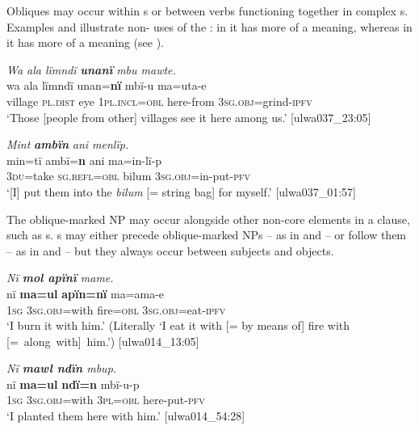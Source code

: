 Obliques may occur within  s or between verbs functioning together in complex s. Examples  and  illustrate non- uses of the : in  it has more of a  meaning, whereas in  it has more of a  meaning (see ).

\ea%
    \label{ex:clause:67}
          \textit{Wa ala lïmndï} \textbf{\textit{unanï}} \textit{mbu mawte.}\\
\gll    wa    ala      lïmndï  unan=\textbf{nï}    mbï-u     ma=uta-e\\
    village  \textsc{pl.dist}  eye    \textsc{1pl.incl=obl}  here-from    3\textsc{sg.obj}=grind-\textsc{ipfv}\\
\glt `Those [people from other] villages see it here among us.’ [ulwa037\_23:05]
\z

\ea%
    \label{ex:clause:68}
          \textit{Mint} \textbf{\textit{ambïn}} \textit{ani menlïp.}\\
\gll    min=tï    ambï=\textbf{n}    ani    ma=in-lï-p\\
    3\textsc{du}=take  \textsc{sg.refl=obl}  bilum  \textsc{3sg.obj}=in-put-\textsc{pfv}\\
\glt `[I] put them into the \textit{bilum} [= string bag] for myself.’ [ulwa037\_01:57]
\z

The oblique-marked NP may occur alongside other non-core elements in a clause, such as s. s may either precede oblique-marked NPs -- as in  and  -- or follow them -- as in  and  -- but they always occur between subjects and objects.

\ea%
    \label{ex:clause:69}
          \textit{Nï \textbf{mol apïnï} mame.}\\
\gll    nï    \textbf{ma=ul}      \textbf{apïn=nï}   ma=ama-e\\
    1\textsc{sg}  3\textsc{sg.obj}=with  fire=\textsc{obl}  3\textsc{sg.obj}=eat-\textsc{ipfv}\\
\glt `I burn it with him.’ (Literally ‘I eat it with [= by means of] fire with \mbox{[= along with] him.’)} [ulwa014\_13:05]
\z

\ea%
    \label{ex:clause:70}
          \textit{Nï \textbf{mawl ndïn} mbup.}\\
\gll    nï    \textbf{ma=ul}      \textbf{ndï=n}    mbï-u-p\\
    1\textsc{sg}  3\textsc{sg.obj}=with  \textsc{3pl=obl}  here-put-\textsc{pfv}\\
\glt `I planted them here with him.’ [ulwa014\_54:28]
\z

